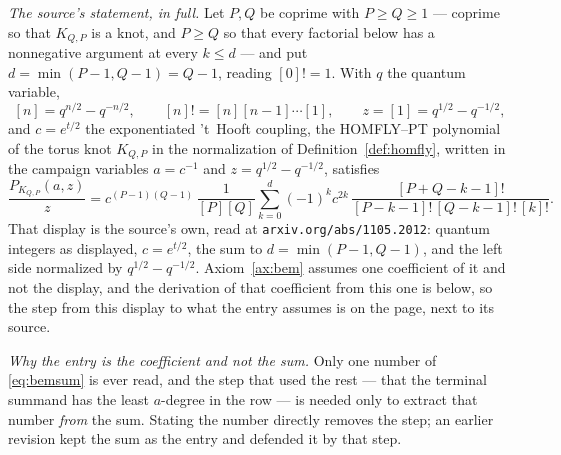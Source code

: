 \begin{remark}
\label{rem:bemfidelity}
\emph{The source's statement, in full.} Let $P,Q$ be coprime with
$P\geq Q\geq1$ --- coprime so that $K_{Q,P}$ is a knot, and $P\geq Q$ so that
every factorial below has a nonnegative argument at every $k\leq d$ --- and put
$d=\min(P-1,Q-1)=Q-1$, reading $[0]!=1$. With $q$ the quantum variable,
\[
   [n]=q^{n/2}-q^{-n/2},\qquad [n]!=[n][n-1]\cdots[1],\qquad
   z=[1]=q^{1/2}-q^{-1/2},
\]
and $c=e^{t/2}$ the exponentiated 't~Hooft coupling, the HOMFLY--PT polynomial
of the torus knot $K_{Q,P}$ in the normalization of
Definition~\ref{def:homfly}, written in the campaign variables $a=c^{-1}$ and
$z=q^{1/2}-q^{-1/2}$, satisfies
\begin{equation}
   \frac{P_{K_{Q,P}}(a,z)}{z}
   =c^{(P-1)(Q-1)}\,\frac{1}{[P][Q]}
   \sum_{k=0}^{d}(-1)^k c^{2k}\,
   \frac{[P+Q-k-1]!}{[P-k-1]!\,[Q-k-1]!\,[k]!} .
\label{eq:bemsum}
\end{equation}
That display is the source's own, read at \texttt{arxiv.org/abs/1105.2012}:
quantum integers as displayed, $c=e^{t/2}$, the sum to $d=\min(P-1,Q-1)$, and
the left side normalized by $q^{1/2}-q^{-1/2}$. Axiom~\ref{ax:bem} assumes one
coefficient of it and not the display, and the derivation of that coefficient
from this one is below, so the step from this display to what the entry
assumes is on the page, next to its source.

\emph{Why the entry is the coefficient and not the sum.} Only one number of
\eqref{eq:bemsum} is ever read, and the step that used the rest --- that the
terminal summand has the least $a$-degree in the row --- is needed only to
extract that number \emph{from} the sum. Stating the number directly removes
the step; an earlier revision kept the sum as the entry and defended it by that
step.


\end{remark}
